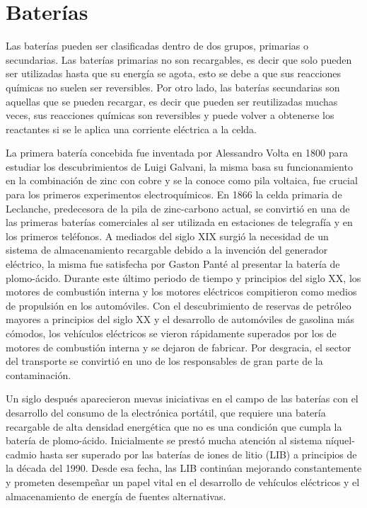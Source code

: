 \section{Baterías}

Las baterías pueden ser clasificadas dentro de dos grupos, primarias o 
secundarias. Las baterías primarias no son recargables, es decir que solo pueden
ser utilizadas hasta que su energía se agota, esto se debe a que sus reacciones
químicas no suelen ser reversibles. Por otro lado, las baterías secundarias son 
aquellas que se pueden recargar, es decir que pueden ser reutilizadas muchas 
veces, sus reacciones químicas son reversibles y puede volver a obtenerse los 
reactantes si se le aplica una corriente eléctrica a la celda.

La primera batería concebida fue inventada por Alessandro Volta en 1800 para 
estudiar los descubrimientos de Luigi Galvani, la misma basa su funcionamiento 
en la combinación de zinc con cobre y se la conoce como pila voltaica, fue 
crucial para los primeros experimentos electroquímicos. En 1866 la celda primaria 
de Leclanche, predecesora de la pila de zinc-carbono actual, se convirtió en una
de las primeras baterías comerciales al ser utilizada en estaciones de telegrafía
y en los primeros teléfonos. A mediados del siglo XIX surgió la necesidad de un 
sistema de almacenamiento recargable debido a la invención del generador 
eléctrico, la misma fue satisfecha por Gaston Panté al presentar la batería de 
plomo-ácido. Durante este último periodo de tiempo y principios del siglo XX, 
los motores de combustión interna y los motores eléctricos compitieron como medios
de propulsión en los automóviles. Con el descubrimiento de reservas de petróleo 
mayores a principios del siglo XX y el desarrollo de automóviles de gasolina más
cómodos, los vehículos eléctricos se vieron rápidamente superados por los de 
motores de combustión interna y se dejaron de fabricar. Por desgracia, el sector 
del transporte se convirtió en uno de los responsables de gran parte de la 
contaminación.

Un siglo después aparecieron nuevas iniciativas en el campo de las baterías con
el desarrollo del consumo de la electrónica portátil, que requiere una batería 
recargable de alta densidad energética que no es una condición que cumpla la 
batería de plomo-ácido. Inicialmente se prestó mucha atención al sistema 
níquel-cadmio hasta ser superado por las baterías de iones de litio (LIB) a 
principios de la década del 1990. Desde esa fecha, las LIB continúan mejorando
constantemente y prometen desempeñar un papel vital en el desarrollo de vehículos
eléctricos y el almacenamiento de energía de fuentes alternativas. %

